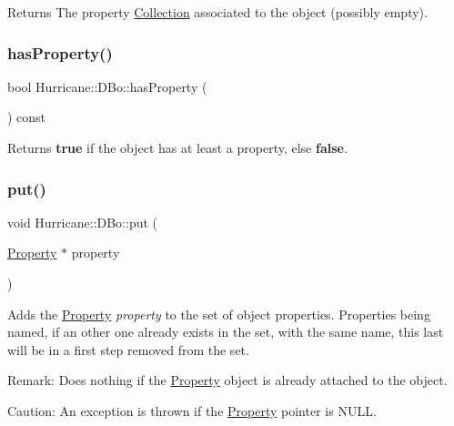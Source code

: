 \begin{DoxyReturn}{Returns}
The property \hyperlink{classHurricane_1_1Collection}{Collection} associated to the object (possibly empty). 
\end{DoxyReturn}
\mbox{\label{classHurricane_1_1DBo_a1563f094565030c77592ed82f9a9989b}} 
\subsubsection{\texorpdfstring{has\+Property()}{hasProperty()}}
{\footnotesize\ttfamily bool Hurricane\+::\+D\+Bo\+::has\+Property (\begin{DoxyParamCaption}{ }\end{DoxyParamCaption}) const\hspace{0.3cm}{\ttfamily [inline]}}

\begin{DoxyReturn}{Returns}
{\bfseries true} if the object has at least a property, else {\bfseries false}. 
\end{DoxyReturn}
\mbox{\label{classHurricane_1_1DBo_a8979674f11507cb4c7c5251b41ed72d5}} 
\subsubsection{\texorpdfstring{put()}{put()}}
{\footnotesize\ttfamily void Hurricane\+::\+D\+Bo\+::put (\begin{DoxyParamCaption}\item[{\hyperlink{classHurricane_1_1Property}{Property} $\ast$}]{property }\end{DoxyParamCaption})}

Adds the \hyperlink{classHurricane_1_1Property}{Property} {\itshape property} to the set of object properties. Properties being named, if an other one already exists in the set, with the same name, this last will be in a first step removed from the set.

\begin{DoxyParagraph}{Remark\+:}
Does nothing if the \hyperlink{classHurricane_1_1Property}{Property} object is already attached to the object.
\end{DoxyParagraph}
\begin{DoxyParagraph}{Caution\+:}
An exception is thrown if the \hyperlink{classHurricane_1_1Property}{Property} pointer is {\ttfamily N\+U\+LL}. 
\end{DoxyParagraph}
\mbox{\label{classHurricane_1_1DBo_a7833a1f0b8c704930bdc00861e63cf5e}} 
